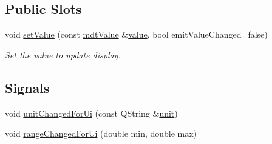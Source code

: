 \subsection*{Public Slots}
\begin{DoxyCompactItemize}
\item 
void \hyperlink{classmdt_analog_io_aa2c2fb87d67aad7bbba1b488cc8c1df2}{set\-Value} (const \hyperlink{classmdt_value}{mdt\-Value} \&\hyperlink{classmdt_abstract_io_a839b0d3a4a1d4616e5b20d744c5f75a1}{value}, bool emit\-Value\-Changed=false)
\begin{DoxyCompactList}\small\item\em Set the value to update display. \end{DoxyCompactList}\end{DoxyCompactItemize}
\subsection*{Signals}
\begin{DoxyCompactItemize}
\item 
void \hyperlink{classmdt_analog_io_aa81b49605f601850ecfa780f2b758e98}{unit\-Changed\-For\-Ui} (const Q\-String \&\hyperlink{classmdt_analog_io_a126d5b9bf4a0bb9ce9f2ff6a010fef0e}{unit})
\item 
void \hyperlink{classmdt_analog_io_a40735cbbf852790067a6f9b57aac4aa3}{range\-Changed\-For\-Ui} (double min, double max)
\end{DoxyCompactItemize}
